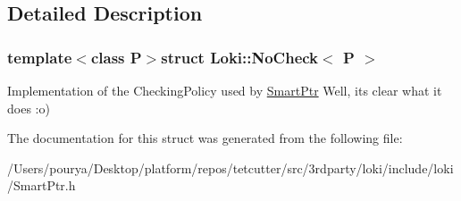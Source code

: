 \subsection{Detailed Description}
\subsubsection*{template$<$class P$>$struct Loki\+::\+No\+Check$<$ P $>$}

Implementation of the Checking\+Policy used by \hyperlink{classLoki_1_1SmartPtr}{Smart\+Ptr} Well, it\textquotesingle{}s clear what it does \+:o) 

The documentation for this struct was generated from the following file\+:\begin{DoxyCompactItemize}
\item 
/\+Users/pourya/\+Desktop/platform/repos/tetcutter/src/3rdparty/loki/include/loki/Smart\+Ptr.\+h\end{DoxyCompactItemize}
